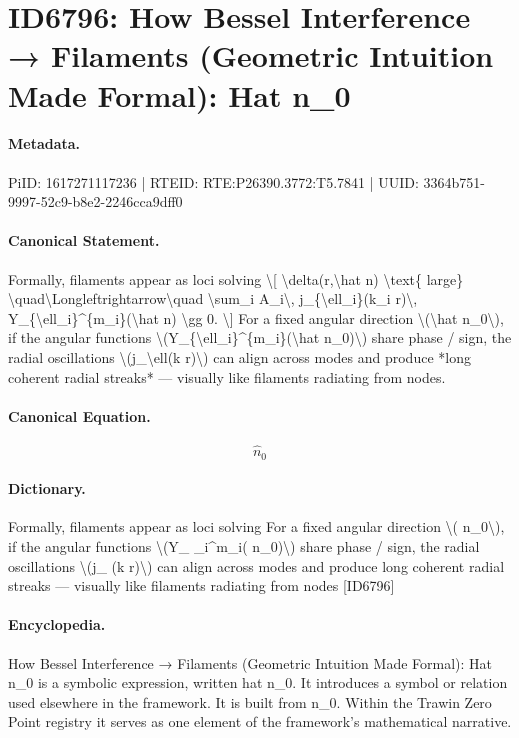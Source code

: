 \section*{ID6796: How Bessel Interference → Filaments (Geometric Intuition Made Formal): Hat n\_0}
\paragraph{Metadata.}
PiID: 1617271117236 | RTEID: RTE:P26390.3772:T5.7841 | UUID: 3364b751-9997-52c9-b8e2-2246cca9dff0

\paragraph{Canonical Statement.}
Formally, filaments appear as loci solving \textbackslash{}[ \textbackslash{}delta(r,\textbackslash{}hat n) \textbackslash{}text\{ large\} \textbackslash{}quad\textbackslash{}Longleftrightarrow\textbackslash{}quad \textbackslash{}sum\_i A\_i\textbackslash{}, j\_\{\textbackslash{}ell\_i\}(k\_i r)\textbackslash{}, Y\_\{\textbackslash{}ell\_i\}\textasciicircum{}\{m\_i\}(\textbackslash{}hat n) \textbackslash{}gg 0. \textbackslash{}] For a fixed angular direction \textbackslash{}(\textbackslash{}hat n\_0\textbackslash{}), if the angular functions \textbackslash{}(Y\_\{\textbackslash{}ell\_i\}\textasciicircum{}\{m\_i\}(\textbackslash{}hat n\_0)\textbackslash{}) share phase / sign, the radial oscillations \textbackslash{}(j\_\textbackslash{}ell(k r)\textbackslash{}) can align across modes and produce *long coherent radial streaks* — visually like filaments radiating from nodes.

\paragraph{Canonical Equation.}
\[
\hat n_0
\]

\paragraph{Dictionary.}
Formally, filaments appear as loci solving For a fixed angular direction \textbackslash{}( n\_0\textbackslash{}), if the angular functions \textbackslash{}(Y\_ \_i\textasciicircum{}m\_i( n\_0)\textbackslash{}) share phase / sign, the radial oscillations \textbackslash{}(j\_ (k r)\textbackslash{}) can align across modes and produce long coherent radial streaks — visually like filaments radiating from nodes [ID6796]

\paragraph{Encyclopedia.}
How Bessel Interference → Filaments (Geometric Intuition Made Formal): Hat n\_0 is a symbolic expression, written hat n\_0. It introduces a symbol or relation used elsewhere in the framework. It is built from n\_0. Within the Trawin Zero Point registry it serves as one element of the framework's mathematical narrative.
